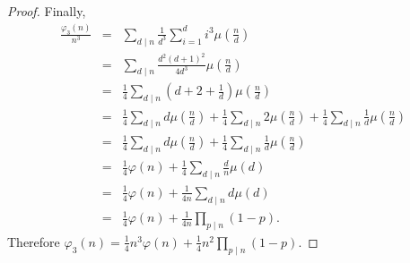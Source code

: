 \documentclass[10pt]{amsart}
\begin{document}
\begin{thm}
\begin{proof}
    Finally, 
    \begin{eqnarray*}
      \frac{\varphi_3(n)}{n^3} &=& \sum_{d \mid n} \frac{1}{d^3}\sum_{i = 1}^d i^3 \mu\left(\frac{n}{d}\right)\\
      &=& \sum_{d \mid n} \frac{d^2(d+1)^2}{4d^3}\mu\left(\frac{n}{d}\right)\\
      &=& \frac{1}{4}\sum_{d \mid n} \left(d + 2 + \frac{1}{d}\right)\mu\left(\frac{n}{d}\right)\\
      &=& \frac{1}{4}\sum_{d \mid n}d\mu\left(\frac{n}{d}\right) + \frac{1}{4}\sum_{d \mid n}2\mu\left(\frac{n}{d}\right) + \frac{1}{4}\sum_{d \mid n}\frac{1}{d}\mu\left(\frac{n}{d}\right)\\
      &=& \frac{1}{4}\sum_{d \mid n}d\mu\left(\frac{n}{d}\right) + \frac{1}{4}\sum_{d \mid n}\frac{1}{d}\mu\left(\frac{n}{d}\right)\\
      &=& \frac{1}{4}\varphi(n) + \frac{1}{4}\sum_{d \mid n}\frac{d}{n}\mu\left(d\right)\\
      &=& \frac{1}{4}\varphi(n) + \frac{1}{4n}\sum_{d \mid n}d\mu\left(d\right)\\
      &=& \frac{1}{4}\varphi(n) + \frac{1}{4n}\prod_{p \mid n}(1 - p).
    \end{eqnarray*}
    Therefore $\varphi_3(n) = \frac{1}{4}n^3\varphi(n) + \frac{1}{4}n^2\prod_{p \mid n}(1 - p)$.
  \end{proof}
\end{thm}
\end{document}
